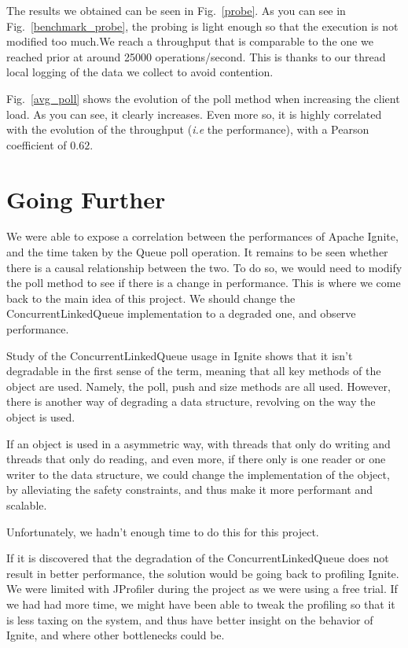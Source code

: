 \documentclass[conference]{IEEEtran}
\begin{document}
The results we obtained can be seen in Fig.~\ref{probe}. As you can see in Fig.~\ref{benchmark_probe}, the probing is light enough so that the execution is not modified too much.We reach a throughput that is comparable to the one we reached prior at around 25000 operations/second. This is thanks to our thread local logging of the data we collect to avoid contention.

Fig.~\ref{avg_poll} shows the evolution of the poll method when increasing the client load. As you can see, it clearly increases. Even more so, it is highly correlated with the evolution of the throughput (\textit{i.e} the performance), with a Pearson coefficient \cite{pearson} of $0.62$.
\bigbreak


\section{Going Further}
We were able to expose a correlation between the performances of Apache Ignite, and the time taken by the Queue poll operation. It remains to be seen whether there is a causal relationship between the two. To do so, we would need to modify the poll method to see if there is a change in performance. This is where we come back to the main idea of this project. We should change the ConcurrentLinkedQueue implementation to a degraded one, and observe performance.

Study of the ConcurrentLinkedQueue usage in Ignite shows that it isn't degradable in the first sense of the term, meaning that all key methods of the object are used. Namely, the poll, push and size methods are all used. However, there is another way of degrading a data structure, revolving on the way the object is used.

If an object is used in a asymmetric way, with threads that only do writing and threads that only do reading, and even more, if there only is one reader or one writer to the data structure, we could change the implementation of the object, by alleviating the safety constraints, and thus make it more performant and scalable.

Unfortunately, we hadn't enough time to do this for this project.

If it is discovered that the degradation of the ConcurrentLinkedQueue does not result in better performance, the solution would be going back to profiling Ignite. We were limited with JProfiler during the project as we were using a free trial. If we had had more time, we might have been able to tweak the profiling so that it is less taxing on the system, and thus have better insight on the behavior of Ignite, and where other bottlenecks could be.
\end{document}
